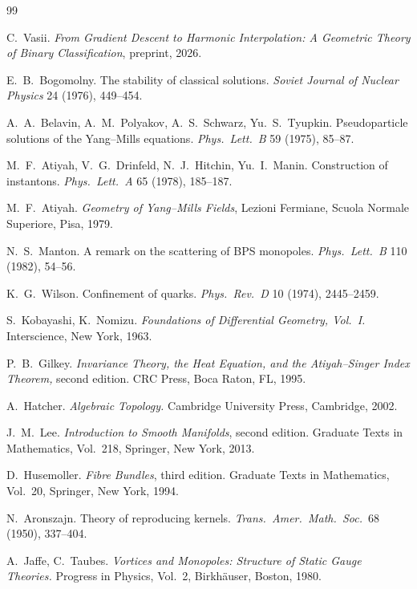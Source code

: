\begin{thebibliography}{99}

C.\ Vasii.
\textit{From Gradient Descent to Harmonic Interpolation: A Geometric
Theory of Binary Classification}, preprint, 2026.

E.~B.\ Bogomolny.
The stability of classical solutions.
\textit{Soviet Journal of Nuclear Physics} 24 (1976), 449--454.

A.~A.\ Belavin, A.~M.\ Polyakov, A.~S.\ Schwarz, Yu.~S.\ Tyupkin.
Pseudoparticle solutions of the Yang--Mills equations.
\textit{Phys.\ Lett.\ B} 59 (1975), 85--87.

M.\ F.\ Atiyah, V.\ G.\ Drinfeld, N.\ J.\ Hitchin, Yu.\ I.\ Manin.
Construction of instantons. \textit{Phys.\ Lett.\ A} 65 (1978),
185--187.

M.\ F.\ Atiyah.
\textit{Geometry of Yang--Mills Fields}, Lezioni Fermiane, Scuola
Normale Superiore, Pisa, 1979.

N.~S.\ Manton.
A remark on the scattering of BPS monopoles.
\textit{Phys.\ Lett.\ B} 110 (1982), 54--56.

K.\ G.\ Wilson.
Confinement of quarks.
\textit{Phys.\ Rev.\ D} 10 (1974), 2445--2459.

S.\ Kobayashi, K.\ Nomizu.
\textit{Foundations of Differential Geometry, Vol.~I.}
Interscience, New York, 1963.

P.\ B.\ Gilkey.
\textit{Invariance Theory, the Heat Equation, and the
Atiyah--Singer Index Theorem,} second edition.
CRC Press, Boca Raton, FL, 1995.

A.\ Hatcher.
\textit{Algebraic Topology.}
Cambridge University Press, Cambridge, 2002.

J.~M.\ Lee.
\textit{Introduction to Smooth Manifolds}, second edition.
Graduate Texts in Mathematics, Vol.\ 218, Springer, New York, 2013.

D.\ Husemoller.
\textit{Fibre Bundles}, third edition.
Graduate Texts in Mathematics, Vol.\ 20, Springer, New York, 1994.

N.\ Aronszajn.
Theory of reproducing kernels.
\textit{Trans.\ Amer.\ Math.\ Soc.}\ 68 (1950), 337--404.

A.\ Jaffe, C.\ Taubes.
\textit{Vortices and Monopoles: Structure of Static Gauge Theories.}
Progress in Physics, Vol.~2, Birkh\"auser, Boston, 1980.


\end{thebibliography}

